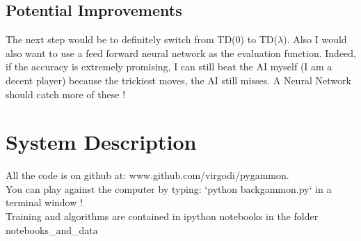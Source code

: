 \documentclass[11pt]{article}
\begin{document}
\subsection{Potential Improvements}

The next step would be to definitely switch from TD(0) to TD($\lambda$). Also I would also want to use a feed forward neural network as the evaluation function. Indeed, if the accuracy is extremely promising, I can still beat the AI myself (I am a decent player) because the trickiest moves, the AI still misses. A Neural Network should catch more of these !
\appendix

\section{System Description}

All the code is on github at: www.github.com/virgodi/pygammon.\\

\noindent You can play against the computer by typing: `python backgammon.py` in a terminal window !\\

\noindent Training and algorithms are contained in ipython notebooks in the folder notebooks\_and\_data


 

\end{document}
